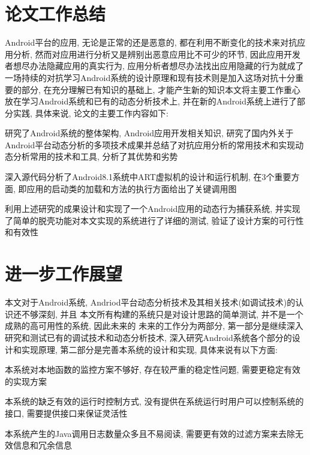 \section{论文工作总结}
Android平台的应用, 无论是正常的还是恶意的, 都在利用不断变化的技术来对抗应用分析, 然而对应用进行分析又是辨别出恶意应用比不可少的环节, 因此应用开发者想尽办法隐藏应用的真实行为, 应用分析者想尽办法找出应用隐藏的行为就成了一场持续的对抗\juhao 学习Android系统的设计原理和现有技术则是加入这场对抗十分重要的部分, 在充分理解已有知识的基础上, 才能产生新的知识\juhao 本文将主要工作重心放在学习Android系统和已有的动态分析技术上, 并在新的Android系统上进行了部分实践, 具体来说, 论文的主要工作内容如下:

	 研究了Android系统的整体架构, Android应用开发相关知识,  研究了国内外关于Android平台动态分析的多项技术成果并总结了对抗应用分析的常用技术和实现动态分析常用的技术和工具, 分析了其优势和劣势\juhao 
	 
	 深入源代码分析了Android8.1系统中ART虚拟机的设计和运行机制, 在3个重要方面, 即应用的启动\dunhao 类的加载和方法的执行方面给出了关键调用图\juhao 
	 
	 利用上述研究的成果设计和实现了一个Android应用的动态行为捕获系统, 并实现了简单的脱壳功能\juhao 对本文实现的系统进行了详细的测试, 验证了设计方案的可行性和有效性\juhao 
	 
\section{进一步工作展望}
本文对于Android系统, Andriod平台动态分析技术及其相关技术(如调试技术)的认识还不够深刻, 并且
本文所有构建的系统只是对设计思路的简单测试, 并不是一个成熟的高可用性的系统, 因此未来的
未来的工作分为两部分, 第一部分是继续深入研究和测试已有的调试技术和动态分析技术, 深入研究Android系统各个部分的设计和实现原理, 第二部分是完善本系统的设计和实现, 具体来说有以下方面:

本系统对本地函数的监控方案不够好, 存在较严重的稳定性问题, 需要更稳定有效的实现方案\juhao

本系统的缺乏有效的运行时控制方式, 没有提供在系统运行时用户可以控制系统的接口, 需要提供接口来保证灵活性\juhao 

本系统产生的Java调用日志数量众多且不易阅读, 需要更有效的过滤方案来去除无效信息和冗余信息\juhao 
	